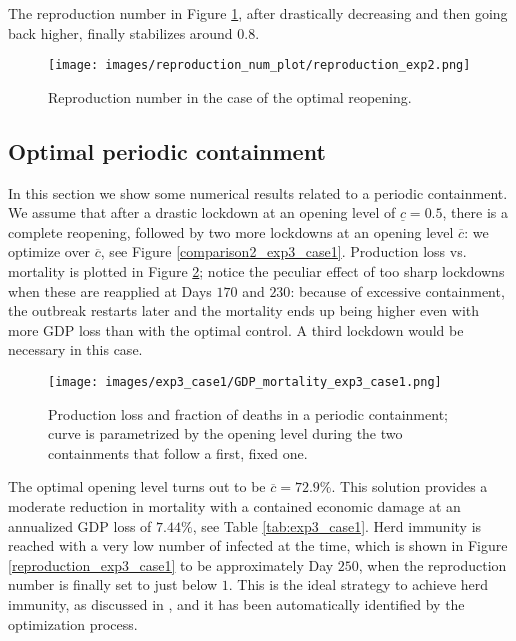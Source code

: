 \documentclass{amsart}
\begin{document}
The reproduction number in  Figure \ref{reproduction_exp2}, after drastically decreasing
and then going back higher, finally stabilizes around $0.8$.
\begin{figure}[h!]
    \centering
    \texttt{[image: images/reproduction\_num\_plot/reproduction\_exp2.png]}
    \caption{Reproduction number in the case of the optimal reopening.}
    \label{reproduction_exp2}
\end{figure}


\newpage

\subsection{Optimal periodic containment}
\label{sec:opt_periodic_cont}
In this section we show some numerical results related to a periodic containment. We assume that after a drastic lockdown at an opening level of  $\underline c=0.5$, there is a
complete reopening, followed by two more lockdowns
at an opening level $\overline c$: we
optimize over $\overline c$, see Figure \ref{comparison2_exp3_case1}. Production loss vs. mortality
is plotted in Figure \ref{GDP_mortality_exp3_case1};
notice the peculiar effect of  too sharp lockdowns
when these are reapplied at Days $170$ and $230$: because of excessive containment,
the outbreak restarts later and
the mortality ends up being higher even with more GDP loss
than with the optimal control.
A third lockdown would be necessary in this case.



\begin{figure}[h!]
    \centering
    \texttt{[image: images/exp3\_case1/GDP\_mortality\_exp3\_case1.png]}
    \caption{Production loss  and fraction of deaths   in  a periodic containment; curve is parametrized by the
    opening level during the two  containments
    that follow a first, fixed one.}
    \label{GDP_mortality_exp3_case1}
\end{figure}
The optimal opening level turns out to be $\overline c=72.9\%$.
This solution provides a moderate reduction in mortality
with a contained economic damage at an annualized
GDP loss of $7.44\%$, see Table
\ref{tab:exp3_case1}. Herd immunity is reached 
with a very low number of infected at the time, 
which is shown in  Figure \ref{reproduction_exp3_case1}
to be approximately Day $250$, when the 
reproduction number is finally set to just below $1$.
This is the ideal strategy to achieve herd
immunity, as discussed in \cite{BM},
and it has been automatically identified by the
 optimization process.
\end{document}
